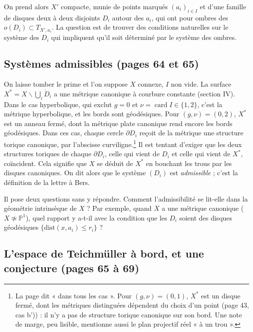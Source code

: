 \documentclass[11pt,a4paper]{article}
\begin{document}
On prend alors $X'$ compacte, munie de points marqués $(a_i)_{i\in I}$ et
d'une famille de disques deux à deux disjoints $D_i$ autour des $a_i$, qui
ont pour ombres des $o(D_i) \subset T_{X',a_i}$. La question est de trouver
des conditions naturelles sur le système des $D_i$ qui impliquent qu'il soit
déterminé par le système des ombres.

\subsection*{Systèmes admissibles (pages 64 et 65)}

On laisse tomber le prime et l'on suppose $X$ connexe, $I$ non vide. La
surface $X^{*} = X \smallsetminus \bigcup_i \mathring{D}_i$ a une métrique
canonique à courbure constante (section IV). Dans le cas hyperbolique, qui
exclut $g = 0$ et $\nu = \operatorname{card} I \in \{1,2\}$, c'est la
métrique hyperbolique, et les bords sont géodésiques. Pour $(g,\nu) = (0,2)$,
$X^{*}$ est un anneau fermé, dont la métrique plate canonique rend encore les
bords géodésiques. Dans ces cas, chaque cercle $\partial D_i$ reçoit de la
métrique une structure torique canonique, par l'abscisse
curviligne.\footnote{La page dit « dans tous les cas ». Pour $(g,\nu) =
(0,1)$, $X^{*}$ est un disque fermé, dont les métriques distinguées dépendent
du choix d'un point (page 43, cas b')) : il n'y a pas de structure torique
canonique sur son bord. Une note de marge, peu lisible, mentionne aussi le
plan projectif réel « à un trou ».} Il est tentant d'exiger que les deux
structures toriques de chaque $\partial D_i$, celle qui vient de $D_i$ et celle
qui vient de $X^{*}$, coïncident. Cela signifie que $X$ se déduit de $X^{*}$ en
bouchant les trous par les disques canoniques. On dit alors que le système
$(D_i)$ est \emph{admissible} ; c'est la définition de la lettre à Bers.

Il pose deux questions sans y répondre. Comment l'admissibilité se lit-elle
dans la géométrie intrinsèque de $X$ ? Par exemple, quand $X$ a une métrique
canonique ($X \not\simeq \mathbb{P}^{1}$), quel rapport y a-t-il avec la
condition que les $D_i$ soient des disques géodésiques
$\{\mathrm{dist}(x, a_i) \leqslant r_i\}$ ?

\subsection*{L'espace de Teichmüller à bord, et une conjecture (pages 65 à 69)}
\end{document}
